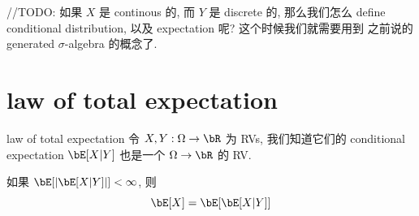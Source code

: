 //TODO: 如果 \(X\) 是 continous 的, 而 \(Y\) 是 discrete 的,
那么我们怎么 define conditional distribution, 以及 expectation 呢?
这个时候我们就需要用到
之前说的 generated \(\sigma\)-algebra 的概念了.








\section{law of total expectation}
\begin{theorem}{law of total expectation}
    令 \(X, Y: \Omega \to \bR \) 为 RVs, 我们知道它们的 conditional expectation \(\bE[X|Y]\) 也是一个 \(\Omega \to \bR\) 的 RV.

    如果 \(\bE[|\bE[X|Y]|] < \infty\), 则
    \[
    \bE[X] = \bE[\bE[X|Y]]
    \]
\end{theorem}
